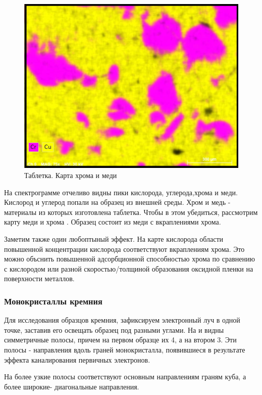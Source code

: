 \documentclass[a4paper,12pt]{article}
\theoremstyle{plain} %
\theoremstyle{definition} %
\theoremstyle{remark} %
\newcommand{\picref}[1]{
	\text{рис(\ref{#1})}
}
\begin{document}
\begin{figure}[h!]
	\centering
	\includegraphics[scale=0.6]{pic11.jpg}
	\caption{Таблетка. Карта хрома и меди}
	\label{pic11}
\end{figure}


На спектрограмме отчеливо видны пики кислорода, углерода,хрома и меди. Кислород и углерод попали на образец из внешней среды. Хром и медь - материалы из которых изготовлена таблетка. Чтобы в этом убедиться, рассмотрим карту меди и хрома \picref{pic10}. Образец состоит из меди с вкраплениями хрома. 

Заметим также один любоптыный эффект. На карте кислорода \picref{pic9} области повышенной концентрации кислорода соответствуют вкраплениям хрома. Это можно объснить повышенной адсорбционной способностью хрома по сравнению с кислородом или разной скоростью/толщиной образования оксидной пленки на поверхности металлов. 

\subsubsection{Монокристаллы кремния}
Для исследования образцов кремния, зафиксируем электронный луч в одной точке, заставив его освещать образец под разными углами. На \picref{pic12} и \picref{pic13} видны симметричные полосы, причем на первом образце их 4, а на втором 3. Эти полосы - направления вдоль граней монокристалла, появившиеся в результате эффекта каналирования первичных электронов.

На \picref{pic12} более узкие полосы соответствуют основным направлениям граням куба, а более широкие- диагональные направления.
\end{document}
